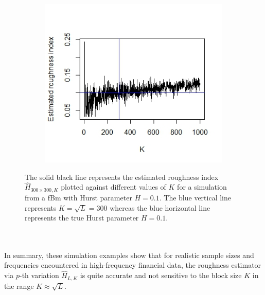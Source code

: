 \documentclass{article}
\begin{document}
\begin{figure}[htbp]
    \centering
    
    \begin{subfigure}{0.78\textwidth}
        \includegraphics[width=\linewidth]{differentK.jpeg}
    \end{subfigure}
    
    \caption{The solid black line represents the estimated roughness index $\hat{H}_{300\times 300,K}$ plotted against different values of $K$ for a simulation from a fBm with Hurst parameter $H=0.1$. The blue vertical line represents $K=\sqrt{L}=300$ whereas the blue horizontal line represents the true Hurst parameter $H=0.1$.}
    \label{fig:checkk}
\end{figure}\\\\
In summary, these simulation examples show that for realistic sample sizes and frequencies encountered in high-frequency financial data, the roughness estimator via $p$-th variation $\widehat{H}_{L,K}$ is quite accurate and not sensitive to the block size $K$ in the range $K\approx \sqrt{L}$.
\end{document}
